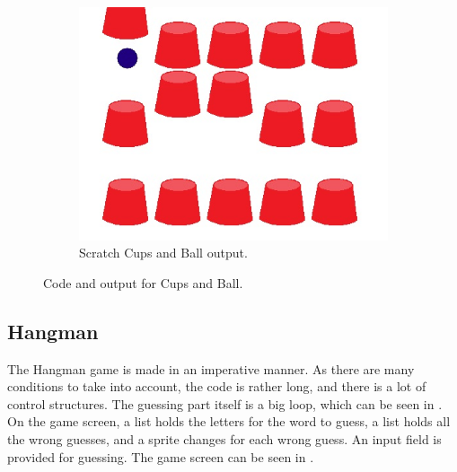 \begin{figure}[h]
    \begin{subfigure}[b]{\textwidth}
    \begin{center}
      \includegraphics[scale=0.5]{./pics/scratch_ball_out}
      \caption{Scratch Cups and Ball output.}
      \label{fig:scratch_ball_out}
    \end{center}
    \end{subfigure}
    \caption{Code and output for Cups and Ball.}
    \label{fig:scratch_ball}
\end{figure}

\subsection{Hangman}
The Hangman game is made in an imperative manner. As there are many conditions to take into account, the code is rather long, and there is a lot of control structures. The guessing part itself is a big loop, which can be seen in . On the game screen, a list holds the letters for the word to guess, a list holds all the wrong guesses, and a sprite changes for each wrong guess. An input field is provided for guessing. The game screen can be seen in .

